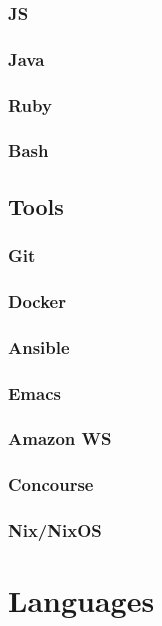 \documentclass[11pt]{article}
\begin{document}
\subsubsection*{JS}
\label{sec:orgfa55c3d}
\subsubsection*{Java}
\label{sec:org9e5bf71}
\subsubsection*{Ruby}
\label{sec:org872a5bc}
\subsubsection*{Bash}
\label{sec:org427e45d}
\subsection*{Tools}
\label{sec:org11b2786}
\subsubsection*{Git}
\label{sec:org868f98a}
\subsubsection*{Docker}
\label{sec:orgc684a5e}
\subsubsection*{Ansible}
\label{sec:org782a20c}
\subsubsection*{Emacs}
\label{sec:org6ad5c62}
\subsubsection*{Amazon WS}
\label{sec:orgabdba13}
\subsubsection*{Concourse}
\label{sec:org4fb1afb}
\subsubsection*{Nix/NixOS}
\label{sec:org9208222}
\section*{Languages}
\label{sec:orgfe44337}
\end{document}
